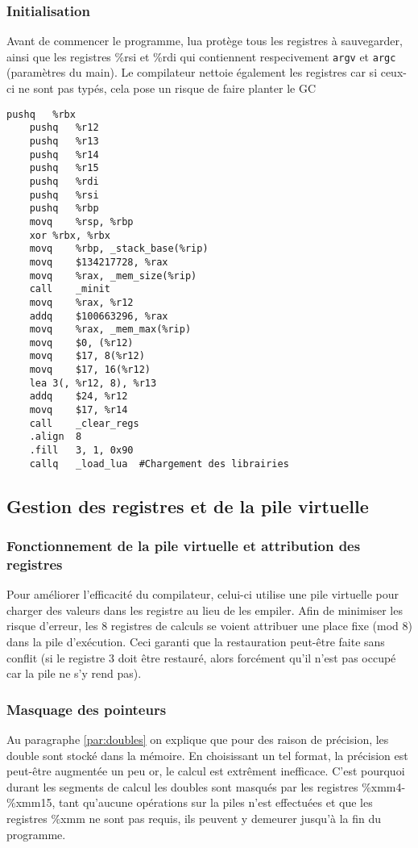 \documentclass{article}
\newcommand{\R}[1]{\%{}{#1}}
\begin{document}
\subsubsection{Initialisation}
Avant de commencer le programme, lua protège tous les registres à sauvegarder, ainsi que les registres \R{rsi} et \R{rdi} qui contiennent respecivement \texttt{argv} et \texttt{argc} (paramètres du main). Le compilateur nettoie également les registres car si ceux-ci ne sont pas typés, cela pose un risque de faire planter le GC

\begin{center}
  \begin{lstlisting}[style=asm]
	pushq	%rbx
	pushq	%r12
	pushq	%r13
	pushq	%r14
	pushq	%r15
	pushq	%rdi
	pushq	%rsi
	pushq	%rbp
	movq	%rsp, %rbp
	xor	%rbx, %rbx
	movq	%rbp, _stack_base(%rip)
	movq	$134217728, %rax
	movq	%rax, _mem_size(%rip)
	call	_minit
	movq	%rax, %r12
	addq	$100663296, %rax
	movq	%rax, _mem_max(%rip)
	movq	$0, (%r12)
	movq	$17, 8(%r12)
	movq	$17, 16(%r12)
	lea	3(, %r12, 8), %r13
	addq	$24, %r12
	movq	$17, %r14
	call	_clear_regs
	.align	8
	.fill	3, 1, 0x90
	callq	_load_lua  #Chargement des librairies
  \end{lstlisting}
\end{center}
\newpage
\subsection{Gestion des registres et de la pile virtuelle}
\subsubsection{Fonctionnement de la pile virtuelle et attribution des registres}
Pour améliorer l'efficacité du compilateur, celui-ci utilise une pile virtuelle pour charger des valeurs dans les registre au lieu de les empiler. Afin de minimiser les risque d'erreur, les 8 registres de calculs se voient attribuer une place fixe (mod 8) dans la pile d'exécution. Ceci garanti que la restauration peut-être faite sans conflit (si le registre 3 doit être restauré, alors forcément qu'il n'est pas occupé car la pile ne s'y rend pas).

\subsubsection{Masquage des pointeurs}
Au paragraphe \ref{par:doubles} on explique que pour des raison de précision, les double sont stocké dans la mémoire. En choisissant un tel format, la précision est peut-être augmentée un peu or, le calcul est extrêment inefficace. C'est pourquoi durant les segments de calcul les doubles sont masqués par les registres \R{xmm4}-\R{xmm15}, tant qu'aucune opérations sur la piles n'est effectuées et que les registres \R{xmm} ne sont pas requis, ils peuvent y demeurer jusqu'à la fin du programme.
\end{document}
